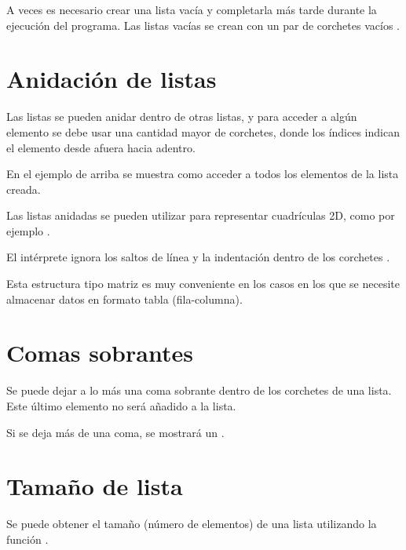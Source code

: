 A veces es necesario crear una lista vacía y completarla más tarde durante la ejecución del programa. Las listas vacías se crean con un par de corchetes vacíos \ttt{[]}.


\section{Anidación de listas}

Las listas se pueden anidar dentro de otras listas, y para acceder a algún elemento se debe usar una cantidad mayor de corchetes, donde los índices indican el elemento desde afuera hacia adentro.


En el ejemplo de arriba se muestra como acceder a todos los elementos de la lista creada.\smallskip

Las listas anidadas se pueden utilizar para representar cuadrículas 2D, como por ejemplo .


El intérprete ignora los saltos de línea y la indentación dentro de los corchetes \ttt{[]}.\smallskip

Esta estructura tipo matriz es muy conveniente en los casos en los que se necesite almacenar datos en formato tabla (fila-columna).

\section{Comas sobrantes}

Se puede dejar a lo más una coma sobrante dentro de los corchetes de una lista. Este último elemento no será añadido a la lista.


Si se deja más de una coma, se mostrará un .


\section{Tamaño de lista}

Se puede obtener el tamaño (número de elementos) de una lista utilizando la función .
  
